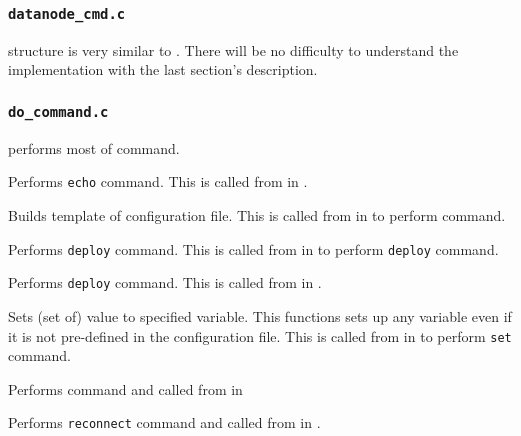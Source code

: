 \subsubsection{\texttt{datanode\_cmd.c}}

   structure is very similar to .
  There will be no difficulty to understand the implementation with the last section's description.
  


\subsubsection{\texttt{do\_command.c}}
  
   performs most of  command.
  
  
      Performs \texttt{echo} command.
      This is called from  in .
  
  
      Builds template of  configuration file.
      This is called from  in  to perform  command.
  
  
      Performs \texttt{deploy} command.
      This is called from  in  to perform \texttt{deploy} command.
  
  
      Performs \texttt{deploy} command.
      This is called from  in .
  
  
      Sets (set of) value to specified variable.
      This functions sets up any variable even if it is not pre-defined in the configuration file.
      This is called from  in  to perform \texttt{set} command.
  
  
      Performs  command and called from  in 
  
  
      Performs \texttt{reconnect} command and called from  in .
  
